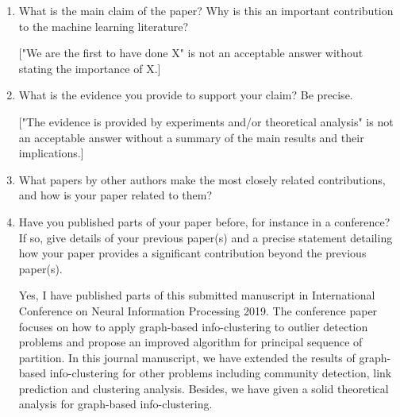 \documentclass{article}
\begin{document}
\begin{enumerate}
\item What is the main claim of the paper? Why is this an important contribution to the machine learning literature?

    ["We are the first to have done X" is not an acceptable answer without stating the importance of X.]

\item What is the evidence you provide to support your claim? Be precise.

    ["The evidence is provided by experiments and/or theoretical analysis" is not an acceptable answer without a summary of the main results and their implications.]

\item What papers by other authors make the most closely related contributions, and how is your paper related to them?

\item Have you published parts of your paper before, for instance in a conference? If so, give details of your previous paper(s) and a precise statement detailing how your paper provides a significant contribution beyond the previous paper(s).

Yes, I have published parts of this submitted manuscript in International Conference on Neural Information Processing 2019.
The conference paper focuses on how to apply graph-based info-clustering to outlier detection problems and propose an improved algorithm for principal
sequence of partition. In this journal manuscript, we have extended the results of graph-based info-clustering for other problems including community
detection, link prediction and clustering analysis. Besides, we have given a solid theoretical analysis for graph-based info-clustering.
\end{enumerate}
\end{document}
